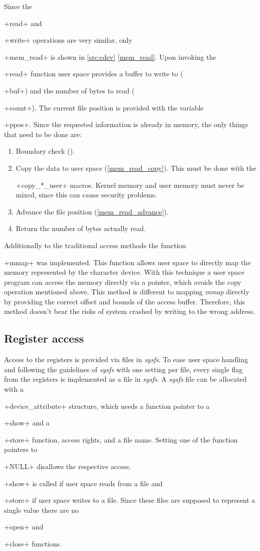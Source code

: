 \documentclass[12pt,a4paper,parskip=full,abstract=true,BCOR=12mm,twoside,open=right]{scrreprt}
\newcommand*{\SavedLstInline}{}
\DeclareRobustCommand*{\lstinline}{%
  \ifmmode
    \let\SavedBGroup\bgroup
    \def\bgroup{%
      \let\bgroup\SavedBGroup
      \hbox\bgroup
    }%
  \fi
  \SavedLstInline
}
\def\device#1{\mbox{\textit{#1}}}
\begin{document}
Since the \lstinline+read+ and \lstinline+write+ operations are very similar,
only \lstinline+mem_read+ is shown in \cref{src:cdev} \cref{mem_read}. Upon invoking the
\lstinline+read+ function user space provides a buffer to write to (\lstinline+buf+)
and the number of bytes to read (\lstinline+count+). The current file
position is provided with the variable \lstinline+ppos+. Since the requested information
is already in memory, the only things that need to be done are:
\begin{enumerate}
    \item Boundary check ().
    \item Copy the data to user space (\cref{mem_read_copy}). This must be
        done with the \lstinline+copy_*_user+ macros. Kernel memory and
        user memory must never be mixed, since this can cause security
        problems\cite{ldd}.
    \item Advance the file position (\cref{mem_read_advance}).
    \item Return the number of bytes actually read.
\end{enumerate}

Additionally to the traditional access methods the function \lstinline+mmap+
was implemented. This function allows user space to directly map the memory
represented by the character device. With this technique a user space program
can access the memory directly via a pointer, which avoids the copy operation
mentioned above. This method is different to mapping \device{mmap}
directly by providing the correct offset and bounds of the access buffer.
Therefore, this method doesn't bear the risks of system crashed by writing
to the wrong address.


\subsection{Register access}
\label{sec:register_access}

Access to the registers is provided via files in \device{sysfs}\cite{sysfs}. To ease
user space handling and following the guidelines of \device{sysfs} with one setting per file,
every single flag from the registers is implemented as a file in \device{sysfs}. A \device{sysfs} file
can be allocated with a \lstinline+device_attribute+ structure, which needs
a function pointer to a \lstinline+show+ and a \lstinline+store+ function, access rights,
and a file name. Setting one of the function pointers to \lstinline+NULL+ disallows the
respective access. \lstinline+show+ is called if user space reads from a file and
\lstinline+store+ if user space writes to a file. Since these files are supposed
to represent a single value there are no \lstinline+open+ and \lstinline+close+
functions.
\end{document}
